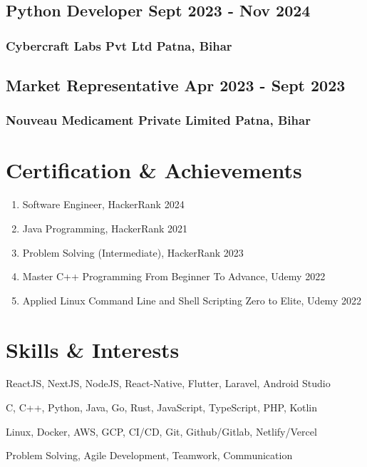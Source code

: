 \documentclass[11pt]{article}
\begin{document}
\subsection{Python Developer \hfill Sept 2023 - Nov 2024}
\subsubsection{Cybercraft Labs Pvt Ltd \hfill Patna, Bihar}
\vspace{8pt}
\subsection{Market Representative \hfill Apr 2023 - Sept 2023}
\subsubsection{Nouveau Medicament Private Limited \hfill Patna, Bihar}

\vspace{18pt}

\section{Certification \& Achievements}
\begin{enumerate}[label=\null, left=0pt..0pt, itemsep=0pt]
	\item Software Engineer, HackerRank \hfill 2024
	\item Java Programming, HackerRank \hfill 2021
	\item Problem Solving (Intermediate), HackerRank \hfill 2023
	\item Master C++ Programming From Beginner To Advance, Udemy \hfill 2022
	\item Applied Linux Command Line and Shell Scripting Zero to Elite, Udemy \hfill 2022
\end{enumerate}

\section{Skills \& Interests}
\begin{description}[itemsep=0pt]
	\item[Frameworks \& Stacks] ReactJS, NextJS, NodeJS, React-Native, Flutter, Laravel, Android Studio
	\item[Programming] C, C++, Python, Java, Go, Rust, JavaScript, TypeScript, PHP, Kotlin
	\item[DevOps] Linux, Docker, AWS, GCP, CI/CD, Git, Github/Gitlab, Netlify/Vercel
  \item[Soft Skills] Problem Solving, Agile Development, Teamwork, Communication
\end{description}
\end{document}
